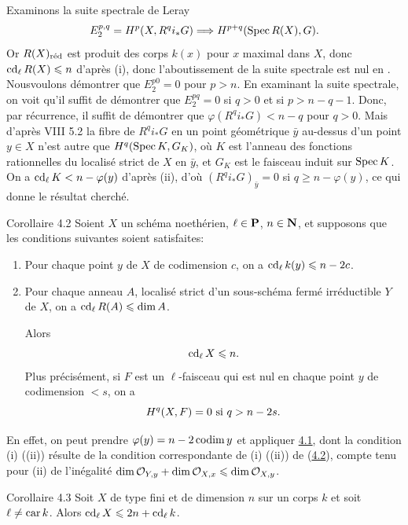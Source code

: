 \documentclass[10pt]{../fichiers-configuration-latex/smfart}
\begin{document}
Examinons la suite spectrale de Leray
$$
E^{p,q}_2=H^p(X,R^qi_{\ast}G)\Longrightarrow H^{p+q}(\operatorname{Spec}
R(X),G){}.
$$
Or $R(X)_{\text{\rm réd}}$ est produit des corps $k(x)$ pour $x$
maximal dans $X$, donc $\operatorname{cd}_{\ell}R(X)\leqslant n$ d'après (i), donc
l'aboutissement de la suite spectrale est nul en .
Nous\pageoriginale voulons démontrer que $E^{p0}_2=0$ pour $p>n$. En
examinant la suite spectrale, on voit qu'il suffit de démontrer que
$E^{pq}_2=0$ si $q>0$ et si $p>n-q-1$. Donc, par récurrence, il suffit
de démontrer que $\varphi(R^qi_{\ast}G)<n-q$ pour $q>0$. Mais d'après
VIII 5.2 la fibre de $R^qi_{\ast}G$ en un point géométrique $\bar{y}$
au-dessus d'un point $y\in X$ n'est autre que $H^q(\operatorname{Spec} K, G_K)$, où
$K$ est l'anneau des fonctions rationnelles du localisé strict de $X$
en $\bar{y}$, et $G_K$ est le faisceau induit sur $\operatorname{Spec} K$. On a
$\operatorname{cd}_{\ell}K<n-\varphi(y)$ d'après (ii), d'où
$(R^qi_{\ast}G)_{\bar{y}}=0$ si $q\geq n-\varphi(y)$, ce qui donne le
résultat cherché.

\begin{enonce*}{Corollaire 4.2}
Soient $X$ un schéma noethérien, $\ell\in \mathbf{P}$,
$n\in \mathbf{N}$, et supposons que les conditions
suivantes soient satisfaites:
\begin{enumerate}
\renewcommand{\theenumi}{\roman{enumi}}
\renewcommand{\labelenumi}{(\theenumi)}
\item Pour chaque point $y$ de $X$ de codimension $c$, on a
  $\operatorname{cd}_{\ell}k(y)\leqslant n-2c$.

\item Pour chaque anneau $A$, localisé strict d'un sous-schéma fermé
  irréductible $Y$ de $X$, on a $\operatorname{cd}_{\ell}R(A)\leqslant \dim A$.

Alors
$$
\operatorname{cd}_{\ell}X\leqslant n{}.
$$
Plus précisément, si $F$ est un $\ell$-faisceau qui est nul en chaque
point $y$ de codimension $<s$, on a
$$
H^q(X,F)=0\mbox{ si } q>n-2s{}.
$$
\end{enumerate}
\end{enonce*}

En effet, on peut prendre $\varphi(y)=n-2\operatorname{codim} y$ et appliquer \hyperref[X.thm4.1]{4.1},
dont la condition (i) (\resp (ii)) résulte de la condition
correspondante de (i) (\resp (ii)) de (\hyperref[X.cor4.2]{4.2}), compte tenu pour (ii) de
l'inégalité $\dim {\mathcal O}_{Y,y}+\dim {\mathcal O}_{X,x}\leqslant \dim {\mathcal O}_{X,y}$.

\begin{enonce*}{Corollaire 4.3}
Soit $X$ de type fini et de dimension $n$ sur un corps $k$ et soit
$\ell\neq \operatorname{car} k$. Alors $\operatorname{cd}_{\ell}X\leqslant 2n+\operatorname{cd}_{\ell}k$.
\end{enonce*}
\end{document}

